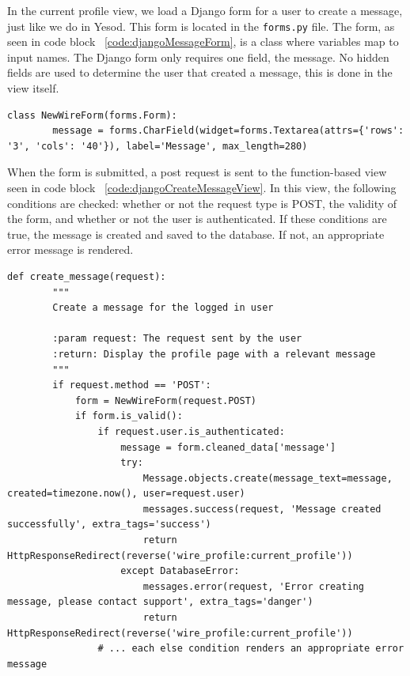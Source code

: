 In the current profile view, we load a Django form for a user to create a message,
just like we do in Yesod. This form is located in the \texttt{forms.py} file. The
form, as seen in code block ~\ref{code:djangoMessageForm}, is a class where variables map
to input names. The Django form only requires one field, the message. No hidden
fields are used to determine the user that created a message, this is done in
the view itself.

\begin{lstlisting}[caption={Django message form},label={code:djangoMessageForm}]
    class NewWireForm(forms.Form):
        message = forms.CharField(widget=forms.Textarea(attrs={'rows': '3', 'cols': '40'}), label='Message', max_length=280)
\end{lstlisting}

When the form is submitted, a post request is sent to the function-based view
seen in code block ~\ref{code:djangoCreateMessageView}. In this view, the following
conditions are checked: whether or not the request type is POST, the validity of the
form, and whether or not the user is authenticated. If these conditions are true,
the message is created and saved to the database. If not, an appropriate error
message is rendered.

\begin{lstlisting}[caption={Function-based create message view},label={code:djangoCreateMessageView}]
    def create_message(request):
        """
        Create a message for the logged in user

        :param request: The request sent by the user
        :return: Display the profile page with a relevant message
        """
        if request.method == 'POST':
            form = NewWireForm(request.POST)
            if form.is_valid():
                if request.user.is_authenticated:
                    message = form.cleaned_data['message']
                    try:
                        Message.objects.create(message_text=message, created=timezone.now(), user=request.user)
                        messages.success(request, 'Message created successfully', extra_tags='success')
                        return HttpResponseRedirect(reverse('wire_profile:current_profile'))
                    except DatabaseError:
                        messages.error(request, 'Error creating message, please contact support', extra_tags='danger')
                        return HttpResponseRedirect(reverse('wire_profile:current_profile'))
                # ... each else condition renders an appropriate error message
\end{lstlisting}

